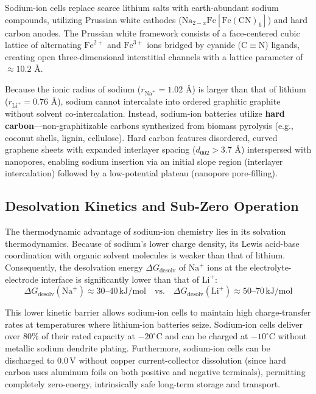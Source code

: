 Sodium-ion cells replace scarce lithium salts with earth-abundant sodium compounds, utilizing Prussian white cathodes ($\mathrm{Na}_{2-x}\mathrm{Fe}[\mathrm{Fe}(\mathrm{CN})_6]$) and hard carbon anodes. The Prussian white framework consists of a face-centered cubic lattice of alternating $\mathrm{Fe}^{2+}$ and $\mathrm{Fe}^{3+}$ ions bridged by cyanide ($\mathrm{C}\equiv\mathrm{N}$) ligands, creating open three-dimensional interstitial channels with a lattice parameter of $\approx 10.2\text{ \AA}$.

Because the ionic radius of sodium ($r_{\mathrm{Na}^+} = 1.02\text{ \AA}$) is larger than that of lithium ($r_{\mathrm{Li}^+} = 0.76\text{ \AA}$), sodium cannot intercalate into ordered graphitic graphite without solvent co-intercalation. Instead, sodium-ion batteries utilize \textbf{hard carbon}---non-graphitizable carbons synthesized from biomass pyrolysis (e.g., coconut shells, lignin, cellulose). Hard carbon features disordered, curved graphene sheets with expanded interlayer spacing ($d_{002} > 3.7\text{ \AA}$) interspersed with nanopores, enabling sodium insertion via an initial slope region (interlayer intercalation) followed by a low-potential plateau (nanopore pore-filling).

\subsection{Desolvation Kinetics and Sub-Zero Operation}

The thermodynamic advantage of sodium-ion chemistry lies in its solvation thermodynamics. Because of sodium's lower charge density, its Lewis acid-base coordination with organic solvent molecules is weaker than that of lithium. Consequently, the desolvation energy $\Delta G_{\mathrm{desolv}}$ of $\mathrm{Na}^+$ ions at the electrolyte-electrode interface is significantly lower than that of $\mathrm{Li}^+$:
\begin{equation}
\Delta G_{\mathrm{desolv}}(\mathrm{Na}^+) \approx 30\text{--}40\,\mathrm{kJ/mol} \quad \text{vs.} \quad \Delta G_{\mathrm{desolv}}(\mathrm{Li}^+) \approx 50\text{--}70\,\mathrm{kJ/mol}
\label{eq:desolvation_energy}
\end{equation}

This lower kinetic barrier allows sodium-ion cells to maintain high charge-transfer rates at temperatures where lithium-ion batteries seize. Sodium-ion cells deliver over $80\%$ of their rated capacity at $-20^\circ\mathrm{C}$ and can be charged at $-10^\circ\mathrm{C}$ without metallic sodium dendrite plating. Furthermore, sodium-ion cells can be discharged to $0.0\,\mathrm{V}$ without copper current-collector dissolution (since hard carbon uses aluminum foils on both positive and negative terminals), permitting completely zero-energy, intrinsically safe long-term storage and transport.

